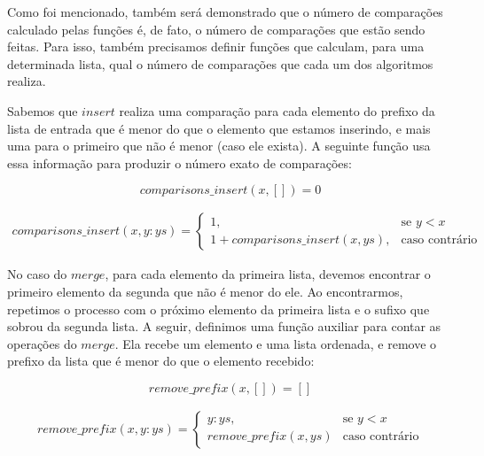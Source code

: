 \documentclass[12pt, oneside, a4paper,english,brazil]{abntex2}
\begin{document}
\qquad Como foi mencionado, tamb\'em ser\'a demonstrado que o n\'umero de compara\c{c}\~oes
calculado pelas fun\c{c}\~oes \'e, de fato, o n\'umero de compara\c{c}\~oes que est\~ao sendo feitas.
Para isso, tamb\'em precisamos definir fun\c{c}\~oes que calculam, para uma determinada lista,
qual o n\'umero de compara\c{c}\~oes que cada um dos algoritmos realiza.

\qquad Sabemos que $insert$ realiza uma compara\c{c}\~ao para cada elemento do prefixo da lista
de entrada que \'e menor do que o elemento que estamos inserindo, e mais uma para o primeiro
que n\~ao \'e menor (caso ele exista). A seguinte fun\c{c}\~ao usa essa informa\c{c}\~ao
para produzir o n\'umero exato de compara\c{c}\~oes:

\begin{equation}
  comparisons\_insert(x, []) = 0
\end{equation}


\begin{equation}
\begin{split}
  comparisons\_insert(x, y : ys) =
    \begin{cases}
      1, &\text{se } y < x \\
      1 + comparisons\_insert(x, ys), &\text{caso contr\'ario}
    \end{cases}
\end{split}
\end{equation}


\qquad No caso do $merge$, para cada elemento da primeira lista, devemos encontrar o primeiro
elemento da segunda que n\~ao \'e menor do ele. Ao encontrarmos, repetimos o processo com o pr\'oximo
elemento da primeira lista e o sufixo que sobrou da segunda lista. A seguir, definimos uma
fun\c{c}\~ao auxiliar para contar as opera\c{c}\~oes do $merge$. Ela
recebe um elemento e uma lista ordenada, e remove o prefixo da lista que \'e menor do que o elemento
recebido:

\begin{equation}
  remove\_prefix(x, []) = []
\end{equation}

\begin{equation}
\begin{split}
  remove\_prefix(x, y : ys) =
    \begin{cases}
      y : ys, &\text{se } y < x \\
      remove\_prefix(x, ys) &\text{caso contr\'ario}
    \end{cases}
\end{split}
\end{equation}
\end{document}
